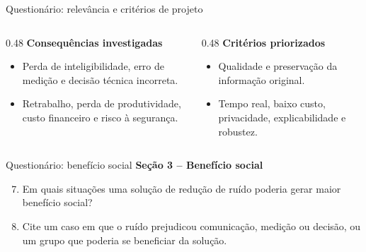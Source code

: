 \documentclass[aspectratio=1610,11pt]{beamer}
\begin{document}
{\begin{frame}[noframenumbering]{Questionário: relevância e critérios de projeto}
    \vspace{0.2cm}
    \begin{columns}[T,onlytextwidth]
        \begin{column}{0.48\textwidth}
            \textbf{Consequências investigadas}
            \begin{itemize}
                \item Perda de inteligibilidade, erro de medição e decisão técnica incorreta.
                \item Retrabalho, perda de produtividade, custo financeiro e risco à segurança.
            \end{itemize}
        \end{column}
        \begin{column}{0.48\textwidth}
            \textbf{Critérios priorizados}
            \begin{itemize}
                \item Qualidade e preservação da informação original.
                \item Tempo real, baixo custo, privacidade, explicabilidade e robustez.
            \end{itemize}
        \end{column}
    \end{columns}
\end{frame}

\begin{frame}[noframenumbering]{Questionário: benefício social}
    \footnotesize
    \textbf{Seção 3 -- Benefício social}
    \begin{enumerate}
        \setcounter{enumi}{6}
        \item Em quais situações uma solução de redução de ruído poderia gerar maior benefício social?
        \item Cite um caso em que o ruído prejudicou comunicação, medição ou decisão, ou um grupo que poderia se beneficiar da solução.
    \end{enumerate}


\end{frame}}
\end{document}
